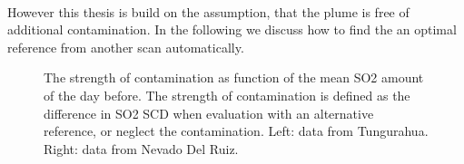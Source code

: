 \\
However this thesis is build on the assumption, that the plume is free of additional contamination. In the following we discuss how to find the an optimal reference from another scan automatically.
\begin{figure}
	\caption{The strength of contamination as function of the mean SO2 amount of the day before. The strength of contamination is defined as the difference in SO2 SCD  when evaluation with an alternative reference, or neglect the contamination. Left: data from Tungurahua. Right: data from Nevado Del Ruiz. }
	\label{fig:contaminationdependencyso2}
\end{figure}